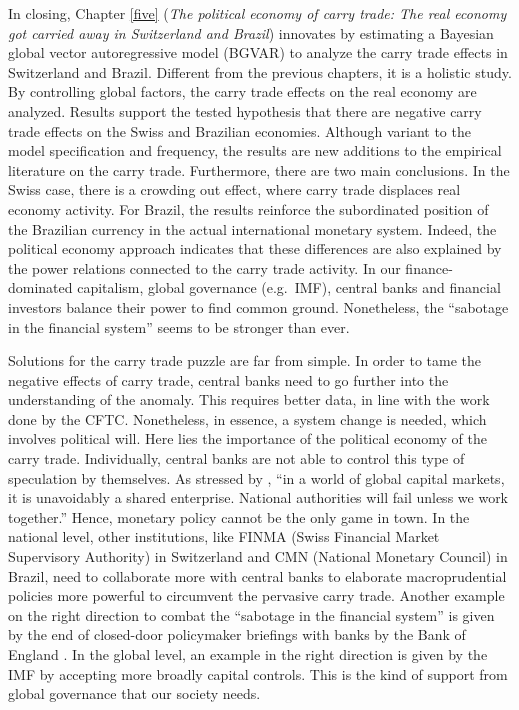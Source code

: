 \documentclass[a4paper, twoside]{templates/ociamthesis}
\begin{document}
In closing, Chapter \ref{five} (\emph{The political economy of carry trade: The real economy got carried away in Switzerland and Brazil}) innovates by estimating a Bayesian global vector autoregressive model (BGVAR) to analyze the carry trade effects in Switzerland and Brazil. Different from the previous chapters, it is a holistic study. By controlling global factors, the carry trade effects on the real economy are analyzed. Results support the tested hypothesis that there are negative carry trade effects on the Swiss and Brazilian economies. Although variant to the model specification and frequency, the results are new additions to the empirical literature on the carry trade. Furthermore, there are two main conclusions. In the Swiss case, there is a crowding out effect, where carry trade displaces real economy activity. For Brazil, the results reinforce the subordinated position of the Brazilian currency in the actual international monetary system. Indeed, the political economy approach indicates that these differences are also explained by the power relations connected to the carry trade activity. In our finance-dominated capitalism, global governance (e.g.~IMF), central banks and financial investors balance their power to find common ground. Nonetheless, the ``sabotage in the financial system'' \autocite{nesvetailova2020} seems to be stronger than ever.

Solutions for the carry trade puzzle are far from simple. In order to tame the negative effects of carry trade, central banks need to go further into the understanding of the anomaly. This requires better data, in line with the work done by the CFTC. Nonetheless, in essence, a system change is needed, which involves political will. Here lies the importance of the political economy of the carry trade. Individually, central banks are not able to control this type of speculation by themselves. As stressed by \textcite[ 16]{tucker2011}, ``in a world of global capital markets, it is unavoidably a shared enterprise. National authorities will fail unless we work together.'' Hence, monetary policy cannot be the only game in town. In the national level, other institutions, like FINMA (Swiss Financial Market Supervisory Authority) in Switzerland and CMN (National Monetary Council) in Brazil, need to collaborate more with central banks to elaborate macroprudential policies more powerful to circumvent the pervasive carry trade. Another example on the right direction to combat the ``sabotage in the financial system'' \autocite{nesvetailova2020} is given by the end of closed-door policymaker briefings with banks by the Bank of England \autocite{bruce2021}. In the global level, an example in the right direction is given by the IMF by accepting more broadly capital controls. This is the kind of support from global governance that our society needs.
\end{document}
